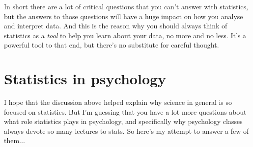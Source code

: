 In short there are a lot of critical questions that you can't answer with statistics, but the answers to those questions will have a huge impact on how you analyse and interpret data. And this is the reason why you should always think of statistics as a {\it tool} to help you learn about your data, no more and no less. It's a powerful tool to that end, but there's no substitute for careful thought.


\section{Statistics in psychology}

I hope that the discussion above helped explain why science in general is so focused on statistics. But I'm guessing that you have a lot more questions about what role statistics plays in psychology, and specifically why psychology classes always devote so many lectures to stats. So here's my attempt to answer a few of them...

